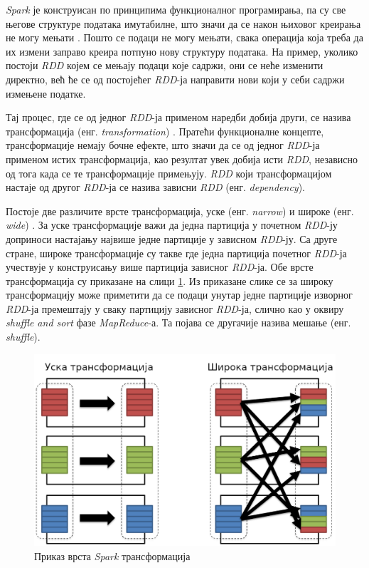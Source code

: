\documentclass[12pt,oneside]{memoir}
\begin{document}
\textit{Spark} је конструисан по принципима функционалног програмирања, па су све његове структуре података имутабилне, што значи да се након њиховог креирања не могу мењати \cite{spark_guide}. Пошто се подаци не могу мењати, свака операција која треба да их измени заправо креира потпуно нову структуру података. На пример, уколико постоји \textit{RDD} којем се мењају подаци које садржи, они се неће изменити директно, већ ће се од постојећег \textit{RDD}-ја направити нови који у себи садржи измењене податке.

Тај процес, где се од једног \textit{RDD}-ја применом наредби добија други, се назива трансформација (енг. \textit{transformation})  \cite{spark_guide}. Пратећи функционалне концепте, трансформације немају бочне ефекте, што значи да се од једног \textit{RDD}-ја применом истих трансформација, као резултат увек добија исти \textit{RDD}, независно од тога када се те трансформације примењују. \textit{RDD} који трансформацијом настаје од другог \textit{RDD}-ја се назива зависни \textit{RDD} (енг. \textit{dependency}).

Постоје две различите врсте трансформација, уске (енг. \textit{narrow}) и широке (енг. \textit{wide}) \cite{spark_guide}. За уске трансформације важи да једна партиција у почетном \textit{RDD}-ју доприноси настајању највише једне партиције у зависном \textit{RDD}-ју. Са друге стране, широке трансформације су такве где једна партиција почетног \textit{RDD}-ја учествује у конструисању више партиција зависног \textit{RDD}-ја. Обе врсте трансформација су приказане на слици \ref{fig:sprk_trnsf}. Из приказане слике се за широку трансформацију може приметити да се подаци унутар једне партиције изворног \textit{RDD}-ја премештају у сваку партицију зависног \textit{RDD}-ја, слично као у оквиру \textit{shuffle and sort} фазе \textit{MapReduce}-а. Та појава се другачије назива мешање (енг. \textit{shuffle}).

\begin{figure}[!ht]
  \centering
  \includegraphics[width=1\textwidth]{pictures/spark_transformation_types.png}
  \caption{Приказ врста \textit{Spark} трансформација}
  \label{fig:sprk_trnsf}
\end{figure}
\end{document}

